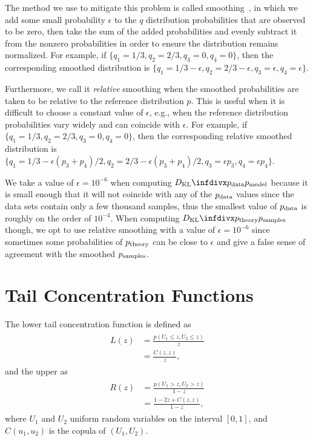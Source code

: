 The method we use to mitigate this problem is called smoothing~\cite{han_kl_divergence}, in which we add some small probability \( \epsilon \) to the \( q \) distribution probabilities that are observed to be zero, then take the sum of the added probabilities and evenly subtract it from the nonzero probabilities in order to ensure the distribution remains normalized.
For example, if \( \{q_1 = 1/3, q_2 = 2/3, q_3 = 0, q_4 = 0\} \), then the corresponding smoothed distribution is \( \{q_1 = 1/3 - \epsilon, q_2 = 2/3 - \epsilon, q_3 = \epsilon, q_4 = \epsilon\} \).

Furthermore, we call it \textit{relative} smoothing when the smoothed probabilities are taken to be relative to the reference distribution \( p \).
This is useful when it is difficult to choose a constant value of \( \epsilon \), e.g., when the reference distribution probabilities vary widely and can coincide with \( \epsilon \).
For example, if \( \{q_1 = 1/3, q_2 = 2/3, q_3 = 0, q_4 = 0\} \), then the corresponding relative smoothed distribution is \( \{q_1 = 1/3 - \epsilon (p_3 + p_4)/2, q_2 = 2/3 - \epsilon (p_3 + p_4)/2, q_3 = \epsilon p_3, q_4 = \epsilon p_4\} \).

We take a value of \( \epsilon = 10^{-6} \) when computing \( \DKL{\pdata}{\pmodel} \) because it is small enough that it will not coincide with any of the \( p_{\text{data}} \) values since the data sets contain only a few thousand samples, thus the smallest value of \( p_{\text{data}} \) is roughly on the order of \( 10^{-4} \).
When computing \( \DKL{\ptheory}{\psamples} \) though, we opt to use relative smoothing with a value of \( \epsilon = 10^{-6} \) since sometimes some probabilities of \( p_{\text{theory}} \) can be close to \( \epsilon \) and give a false sense of agreement with the smoothed \( p_{\text{samples}} \).

\section{Tail Concentration Functions}\label{app:tail_concentration_functions}
The lower tail concentration function is defined as~\cite{venter_2002}
\begin{align}
\begin{split}
    L(z)
        &= \frac{p(U_1 \le z, U_2 \le z)}{z} \\
        &= \frac{C(z,z)}{z},
\end{split}
\end{align}
and the upper as
\begin{align}
\begin{split}
    R(z)
        &= \frac{p(U_1 > z, U_2 > z)}{1-z} \\
        &= \frac{1 - 2z + C(z,z)}{1-z},
\end{split}
\end{align}
where \( U_1 \) and \( U_2 \) uniform random variables on the interval \( [0, 1] \), and \( C(u_1, u_2) \) is the copula of \( (U_1, U_2) \).

